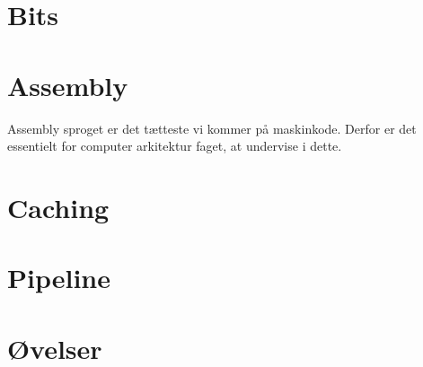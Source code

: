 

\chapter{Bits}
    
    
\chapter{Assembly}
Assembly sproget er det tætteste vi kommer på maskinkode.
Derfor er det essentielt for computer arkitektur faget, at undervise i dette.
    
\chapter{Caching}
    
\chapter{Pipeline}
    
\chapter{Øvelser}
    
